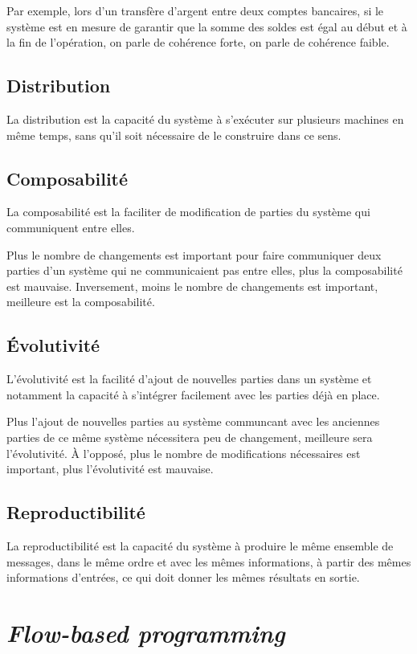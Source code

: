 \documentclass{article}
\begin{document}
Par exemple, lors d'un transfère d'argent entre deux comptes bancaires, si le système
est en mesure de garantir que la somme des soldes est égal au début et à la fin
de l'opération, on parle de cohérence forte, on parle de cohérence faible.

\subsection{Distribution}
La distribution est la capacité du système à s'exécuter sur plusieurs machines en
même temps, sans qu'il soit nécessaire de le construire dans ce sens.

\subsection{Composabilité}
La composabilité est la faciliter de modification de parties du système qui
communiquent entre elles.

Plus le nombre de changements est important pour faire communiquer deux parties
d'un système qui ne communicaient pas entre elles, plus la composabilité est mauvaise.
Inversement, moins le nombre de changements est important, meilleure est la composabilité.

\subsection{Évolutivité}
L'évolutivité est la facilité d'ajout de nouvelles parties dans un système et notamment
la capacité à s'intégrer facilement avec les parties déjà en place.

Plus l'ajout de nouvelles parties au système communcant avec les anciennes parties
de ce même système nécessitera peu de changement, meilleure sera l'évolutivité.
À l'opposé, plus le nombre de modifications nécessaires est important, plus l'évolutivité
est mauvaise.

\subsection{Reproductibilité}
La reproductibilité est la capacité du système à produire le même ensemble de messages,
dans le même ordre et avec les mêmes informations, à partir des mêmes informations d'entrées,
ce qui doit donner les mêmes résultats en sortie.


\section{\emph{Flow-based programming}}\label{flow-based}
\end{document}
